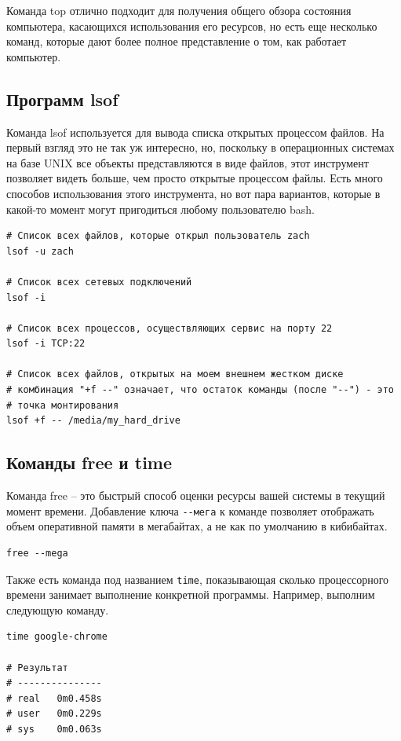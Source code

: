 \documentclass[a4paper,12pt,final,openany]{extbook}
\begin{document}
Команда top отлично подходит для получения общего обзора состояния
компьютера, касающихся использования его ресурсов, но есть еще несколько
команд, которые дают более полное представление о том, как работает
компьютер.

\hypertarget{lsof}{%
\subsection{\texorpdfstring{\protect\hyperlink{lsof}{}Программ
lsof}{Программ lsof}}\label{lsof}}

Команда lsof используется для вывода списка открытых процессом файлов.
На первый взгляд это не так уж интересно, но, поскольку в операционных системах на базе UNIX все объекты представляются в виде файлов, этот
инструмент позволяет видеть больше, чем просто открытые процессом файлы.
Есть много способов использования этого инструмента, но вот пара
вариантов, которые в какой-то момент могут пригодиться любому
пользователю bash.
\begin{verbatim}
# Список всех файлов, которые открыл пользователь zach
lsof -u zach

# Список всех сетевых подключений
lsof -i

# Список всех процессов, осуществляющих сервис на порту 22
lsof -i TCP:22

# Список всех файлов, открытых на моем внешнем жестком диске
# комбинация "+f --" означает, что остаток команды (после "--") - это
# точка монтирования
lsof +f -- /media/my_hard_drive
\end{verbatim}

\hypertarget{free-time}{%
\subsection{\texorpdfstring{\protect\hyperlink{free-time}{}Команды
free и time}{Команды free и time}}\label{free-time}}

Команда free -- это быстрый способ оценки ресурсы вашей системы в
текущий момент времени. Добавление ключа \texttt{-\/-мега} к команде позволяет
отображать объем оперативной памяти в мегабайтах, а не как по умолчанию в  кибибайтах.
\begin{verbatim}
free --mega
\end{verbatim}

Также есть команда под названием \texttt{time}, показывающая сколько
процессорного времени занимает выполнение конкретной программы.
Например, выполним следующую команду.
\begin{verbatim}
time google-chrome

# Результат
# ---------------
# real   0m0.458s
# user   0m0.229s
# sys    0m0.063s
\end{verbatim}
\end{document}
